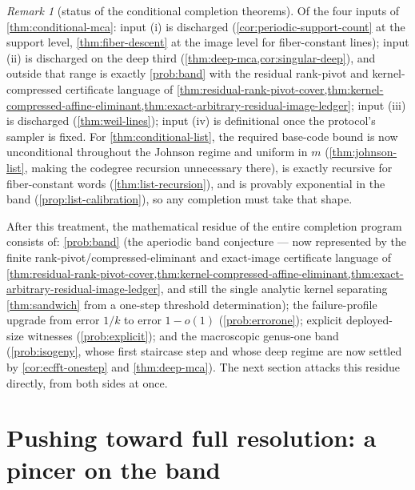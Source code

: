 \documentclass[11pt]{article}
\theoremstyle{definition}
\theoremstyle{remark}
\newtheorem{remark}[theorem]{Remark}
\begin{document}
\begin{remark}[status of the conditional completion theorems]\label{rem:conditional-status}
Of the four inputs of \cref{thm:conditional-mca}: input \textup{(i)} is discharged \textup(\cref{cor:periodic-support-count} at the support level, \cref{thm:fiber-descent} at the image level for fiber-constant lines\textup); input \textup{(ii)} is discharged on the deep third \textup(\cref{thm:deep-mca,cor:singular-deep}\textup), and outside that range is exactly \cref{prob:band} with the residual rank-pivot and kernel-compressed certificate language of \cref{thm:residual-rank-pivot-cover,thm:kernel-compressed-affine-eliminant,thm:exact-arbitrary-residual-image-ledger}; input \textup{(iii)} is discharged \textup(\cref{thm:weil-lines}\textup); input \textup{(iv)} is definitional once the protocol's sampler is fixed. For \cref{thm:conditional-list}, the required base-code bound is now unconditional throughout the Johnson regime and uniform in $m$ \textup(\cref{thm:johnson-list}, making the codegree recursion unnecessary there\textup), is exactly recursive for fiber-constant words \textup(\cref{thm:list-recursion}\textup), and is provably exponential in the band \textup(\cref{prop:list-calibration}\textup), so any completion must take that shape.
\end{remark}

After this treatment, the mathematical residue of the entire completion program consists of: \cref{prob:band} \textup(the aperiodic band conjecture --- now represented by the finite rank-pivot/compressed-eliminant and exact-image certificate language of \cref{thm:residual-rank-pivot-cover,thm:kernel-compressed-affine-eliminant,thm:exact-arbitrary-residual-image-ledger}, and still the single analytic kernel separating \cref{thm:sandwich} from a one-step threshold determination\textup); the failure-profile upgrade from error $1/k$ to error $1-o(1)$ \textup(\cref{prob:errorone}\textup); explicit deployed-size witnesses \textup(\cref{prob:explicit}\textup); and the macroscopic genus-one band \textup(\cref{prob:isogeny}, whose first staircase step and whose deep regime are now settled by \cref{cor:ecfft-onestep} and \cref{thm:deep-mca}\textup). The next section attacks this residue directly, from both sides at once.

\section{Pushing toward full resolution: a pincer on the band}\label{sec:pincer}
\end{document}
